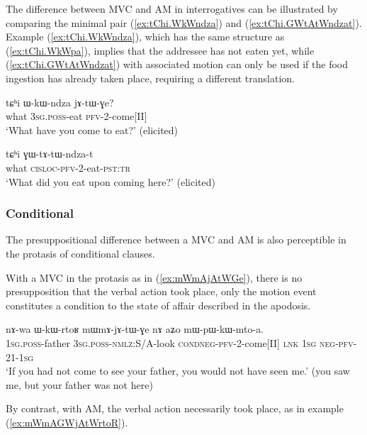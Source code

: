 The difference between MVC and AM in interrogatives can be illustrated by comparing the minimal pair  (\ref{ex:tChi.WkWndza}) and (\ref{ex:tChi.GWtAtWndzat}). Example (\ref{ex:tChi.WkWndza}), which has the same structure as (\ref{ex:tChi.WkWpa}), implies that the addressee has not eaten yet, while (\ref{ex:tChi.GWtAtWndzat}) with associated motion can only be used if the food ingestion has already taken place, requiring a different translation.

\begin{exe}
\ex \label{ex:tChi.WkWndza}
\gll tɕʰi ɯ-kɯ-ndza jɤ-tɯ-ɣe? \\
what \textsc{3sg.poss}-eat \textsc{pfv}-2-come[II] \\
\glt `What have you come to eat?' (elicited)
\end{exe}

\begin{exe}
\ex \label{ex:tChi.GWtAtWndzat}
\gll tɕʰi ɣɯ-tɤ-tɯ-ndza-t \\
what \textsc{cisloc}-\textsc{pfv}-2-eat-\textsc{pst:tr}    \\
\glt `What did you eat upon coming here?' (elicited)
\end{exe}

\subsubsection{Conditional} \label{sec:am.conditional}
The presuppositional difference between a MVC and AM is also perceptible in the protasis of conditional clauses. 

With a MVC in the protasis as in (\ref{ex:mWmAjAtWGe}), there is no presupposition that the verbal action took place, only the motion event constitutes a condition to the state of affair described in the apodosis.

\begin{exe}
\ex \label{ex:mWmAjAtWGe}
\gll nɤ-wa ɯ-kɯ-rtoʁ mɯ\redp{}mɤ-jɤ-tɯ-ɣe nɤ aʑo mɯ-pɯ-kɯ-mto-a. \\
\textsc{1sg.poss}-father \textsc{3sg.poss-}\textsc{nmlz}:S/A-look \textsc{cond}\redp{}\textsc{neg}-\textsc{pfv}-2-come[II] \textsc{lnk} \textsc{1sg} \textsc{neg}-\textsc{pfv}-2\fl{}1-\textsc{1sg} \\
\glt `If you had not come to see your father, you would not have seen me.' (you saw me, but your father was not here)
\end{exe}

By contrast, with AM, the verbal action necessarily took place, as in example (\ref{ex:mWmAGWjAtWrtoR}).

